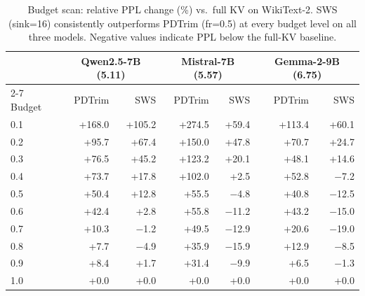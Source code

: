 \documentclass[11pt]{article}
\newcommand{\sws}{SWS}
\theoremstyle{definition}
\theoremstyle{plain}
\begin{document}
\begin{table}[t]
\centering
\caption{Budget scan: relative PPL change (\%) vs.\ full KV on WikiText-2.  \sws{} (sink=16) consistently outperforms PDTrim (fr=0.5) at every budget level on all three models.  Negative values indicate PPL below the full-KV baseline.}
\label{tab:budget-scan}
\small
\begin{tabular}{lrr|rr|rr}
\toprule
 & \multicolumn{2}{c|}{Qwen2.5-7B (5.11)} & \multicolumn{2}{c|}{Mistral-7B (5.57)} & \multicolumn{2}{c}{Gemma-2-9B (6.75)} \\
\cmidrule{2-7}
Budget & PDTrim & \sws{} & PDTrim & \sws{} & PDTrim & \sws{} \\
\midrule
0.1 & +168.0 & +105.2 & +274.5 & +59.4 & +113.4 & +60.1 \\
0.2 & +95.7 & +67.4 & +150.0 & +47.8 & +70.7 & +24.7 \\
0.3 & +76.5 & +45.2 & +123.2 & +20.1 & +48.1 & +14.6 \\
0.4 & +73.7 & +17.8 & +102.0 & +2.5 & +52.8 & $-$7.2 \\
0.5 & +50.4 & +12.8 & +55.5 & $-$4.8 & +40.8 & $-$12.5 \\
0.6 & +42.4 & +2.8 & +55.8 & $-$11.2 & +43.2 & $-$15.0 \\
0.7 & +10.3 & $-$1.2 & +49.5 & $-$12.9 & +20.6 & $-$19.0 \\
0.8 & +7.7 & $-$4.9 & +35.9 & $-$15.9 & +12.9 & $-$8.5 \\
0.9 & +8.4 & +1.7 & +31.4 & $-$9.9 & +6.5 & $-$1.3 \\
1.0 & +0.0 & +0.0 & +0.0 & +0.0 & +0.0 & +0.0 \\
\bottomrule
\end{tabular}
\end{table}
\end{document}
